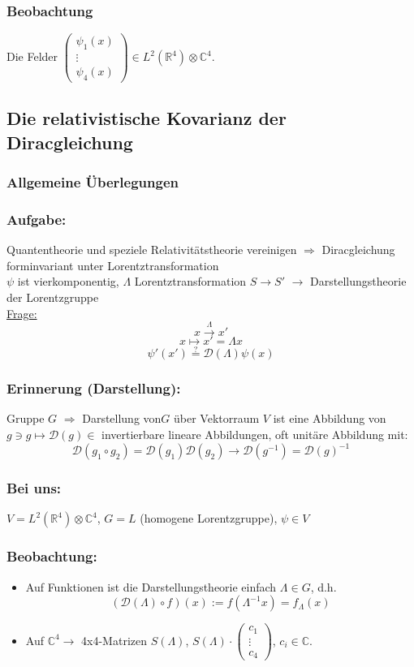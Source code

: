 \documentclass[twoside,a4paper]{scrartcl}
\newcommand{\R}{\mathbb{R}}
\newcommand{\C}{\mathbb{C}}
\newcommand{\D}{\mathcal{D}}
\renewcommand{\1}{\mathds{1}}
\newcommand{\Ra}{\Rightarrow}
\newcommand{\ra}{\rightarrow}
\renewcommand{\L}{\Lambda}
\renewcommand{\R}{\mathbb{R}}
\renewcommand{\C}{\mathbb{C}}
\begin{document}
\subsubsection*{Beobachtung}
Die Felder $\begin{pmatrix}\psi_1(x) \\ \vdots \\ \psi_4(x)\end{pmatrix}\in L^2(\R^4)\otimes \C^4$.

\subsection{Die relativistische Kovarianz der Diracgleichung}
\subsubsection{Allgemeine Überlegungen}
\subsubsection*{Aufgabe:}
Quantentheorie und speziele Relativitätstheorie vereinigen $\Ra$ Diracgleichung forminvariant unter Lorentztransformation\\
$\psi$ ist vierkomponentig, $\L$ Lorentztransformation  $S \ra S'$ $\ra$ Darstellungstheorie der Lorentzgruppe
\\ \underline{Frage:}\\
$$x \stackrel{\L}{\ra} x'$$
$$x \mapsto x'=\L x$$
$$\psi'(x')\stackrel{?}{=} \D(\L) \psi(x)$$
\subsubsection*{Erinnerung (Darstellung):}
Gruppe $G$ $\Ra$ Darstellung von$G$ über Vektorraum $V$ ist eine Abbildung von $g \ni g \mapsto \D(g)\in$ invertierbare lineare Abbildungen, oft unitäre Abbildung mit:
$$\D(g_1\circ g_2)=\D(g_1)\D(g_2) \ra \D(g^{-1})=\D(g)^{-1}$$
\subsubsection*{Bei uns:}
$V=L^2(\R^4)\otimes \C^4$, $G=L$ (homogene Lorentzgruppe), $\psi \in V$
\subsubsection*{Beobachtung:}
\begin{itemize}
\item Auf Funktionen ist die Darstellungstheorie einfach $\L \in G$, d.h. 
$$(\D(\L)\circ f)(x):=f(\L^{-1}x)=f_\L(x)$$
\item Auf $\C^4 \ra$ 4x4-Matrizen $S(\L)$, $S(\L)\cdot \begin{pmatrix}c_1 \\ \vdots \\ c_4\end{pmatrix}$, $c_i \in \C$.
\end{itemize}
\end{document}
